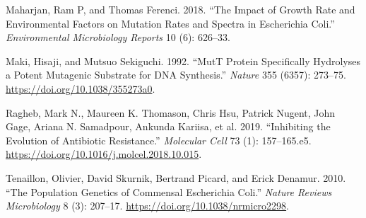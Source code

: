 \documentclass[
  12pt,
  letterpaper,
  DIV=11,
  numbers=noendperiod]{scrreprt}
\newlength{\cslhangindent}
\newlength{\cslentryspacingunit} %
\newenvironment{CSLReferences}[2] %
 {%
  \setlength{\parindent}{0pt}
  \ifodd #1
  \let\oldpar\par
  \def\par{\hangindent=\cslhangindent\oldpar}
  \fi
  \setlength{\parskip}{#2\cslentryspacingunit}
 }%
 {}
\begin{document}
\begin{CSLReferences}{1}{0}
\leavevmode{}%
Maharjan, Ram P, and Thomas Ferenci. 2018. {``The Impact of Growth Rate
and Environmental Factors on Mutation Rates and Spectra in Escherichia
Coli.''} \emph{Environmental Microbiology Reports} 10 (6): 626--33.

\leavevmode{}%
Maki, Hisaji, and Mutsuo Sekiguchi. 1992. {``MutT Protein Specifically
Hydrolyses a Potent Mutagenic Substrate for DNA Synthesis.''}
\emph{Nature} 355 (6357): 273--75.
\url{https://doi.org/10.1038/355273a0}.

\leavevmode{}%
Ragheb, Mark N., Maureen K. Thomason, Chris Hsu, Patrick Nugent, John
Gage, Ariana N. Samadpour, Ankunda Kariisa, et al. 2019. {``Inhibiting
the Evolution of Antibiotic Resistance.''} \emph{Molecular Cell} 73 (1):
157--165.e5. \url{https://doi.org/10.1016/j.molcel.2018.10.015}.

\leavevmode{}%
Tenaillon, Olivier, David Skurnik, Bertrand Picard, and Erick Denamur.
2010. {``The Population Genetics of Commensal Escherichia Coli.''}
\emph{Nature Reviews Microbiology} 8 (3): 207--17.
\url{https://doi.org/10.1038/nrmicro2298}.

\end{CSLReferences}
\end{document}
